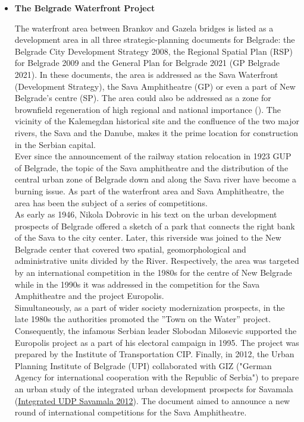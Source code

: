 \documentclass[11pt]{report}
\begin{document}
{{{{\begin{itemize}
\item \textbf{The Belgrade Waterfront Project}

The waterfront area between Brankov and Gazela bridges is listed as a development area in all three strategic-planning documents for Belgrade: the Belgrade City Development Strategy 2008, the Regional Spatial Plan (RSP) for Belgrade 2009 and the General Plan for Belgrade 2021 (GP Belgrade 2021). In these documents, the area is addressed as the Sava Waterfront (Development Strategy), the Sava Amphitheatre (GP) or even a part of New Belgrade’s centre (SP). The area could also be addressed as a zone for brownfield regeneration of high regional and national importance  (\href{Peric}{\citealt{peric_evolution_2016}}).
The vicinity of the Kalemegdan historical site and the confluence of the two major rivers, the Sava and the Danube, makes it the prime location for construction in the Serbian capital.
\\

Ever since the announcement of the railway station relocation in 1923 GUP of Belgrade, the topic of the Sava amphitheatre and the distribution of the central urban zone of Belgrade down and along the Sava river have become a burning issue. As part of the waterfront area and Sava Amphitheatre, the area has been the subject of a series of competitions.
\\
As early as 1946, Nikola Dobrovic in his text on the urban development prospects of Belgrade offered a sketch of a park that connects the right bank of the Sava to the city center. Later, this riverside was joined to the New Belgrade center that covered two spatial, geomorphological and administrative units divided by the River. Respectively, the area was targeted by an international competition in the 1980s for the centre of New Belgrade while in the 1990s it was addressed in the competition for the Sava Amphitheatre and the project Europolis.
\\

Simultaneously, as a part of wider society modernization prospects, in the late 1980s the authorities promoted the ”Town on the Water” project. Consequently, the infamous Serbian leader Slobodan Milosevic supported the Europolis project as a part of his electoral campaign in 1995. The project was prepared by the Institute of Transportation CIP. Finally, in 2012, the Urban Planning Institute of Belgrade (UPI) collaborated with GIZ ("German Agency for international cooperation with the Republic of Serbia") to prepare an urban study of the integrated urban development prospects for Savamala (\href{Integrated UDP Savamala 2012}{Integrated UDP Savamala 2012}).
The document aimed to announce a new round of international competitions for the Sava Amphitheatre.
\\


\end{itemize}}}}}
\end{document}
